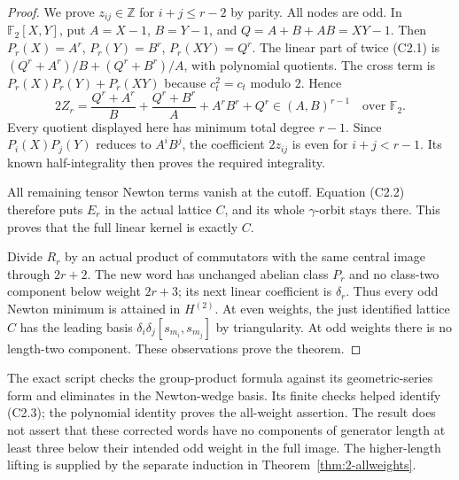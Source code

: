 \begin{proof}
We prove $z_{ij}\in\mathbb Z$ for $i+j\leq r-2$ by parity.
All nodes are odd. In $\mathbb F_2[X,Y]$, put
$A=X-1$, $B=Y-1$, and $Q=A+B+AB=XY-1$.
Then $P_r(X)=A^r$, $P_r(Y)=B^r$, $P_r(XY)=Q^r$.
The linear part of twice (C2.1) is
$(Q^r+A^r)/B+(Q^r+B^r)/A$, with polynomial quotients.
The cross term is $P_r(X)P_r(Y)+P_r(XY)$ because
$c_t^2=c_t$ modulo $2$. Hence
\[
 2Z_r=\frac{Q^r+A^r}{B}+\frac{Q^r+B^r}{A}
                      +A^rB^r+Q^r
       \in(A,B)^{r-1}\quad\text{over }\mathbb F_2.    \tag{C2.3}
\]
Every quotient displayed here has minimum total degree
$r-1$. Since $P_i(X)P_j(Y)$ reduces to $A^iB^j$, the
coefficient $2z_{ij}$ is even for $i+j<r-1$. Its known
half-integrality then proves the required integrality.

All remaining tensor Newton terms vanish at the cutoff.
Equation (C2.2) therefore puts $E_r$ in the actual lattice
$C$, and its whole $\gamma$-orbit stays there. This proves
that the full linear kernel is exactly $C$.

Divide $R_r$ by an actual product of commutators with the
same central image through $2r+2$. The new word has unchanged
abelian class $P_r$ and no class-two component below weight
$2r+3$; its next linear coefficient is $\delta_r$. Thus every
odd Newton minimum is attained in $H^{(2)}$. At even weights,
the just identified lattice $C$ has the leading basis
$\delta_i\delta_j[s_{m_i},s_{m_j}]$ by triangularity. At odd
weights there is no length-two component. These observations
prove the theorem.
\end{proof}

The exact script 
checks the group-product formula against its geometric-series
form and eliminates in the Newton-wedge basis. Its finite
checks helped identify (C2.3); the polynomial identity proves
the all-weight assertion. The result does not assert that
these corrected words have no components of generator length
at least three below their intended odd weight in the full
image. The higher-length lifting is supplied by the separate induction
in Theorem~\ref{thm:2-allweights}.
